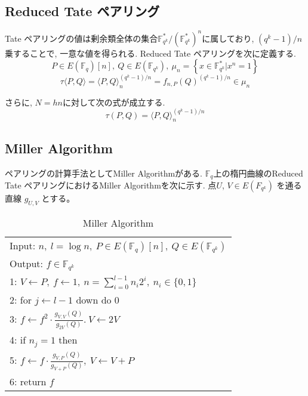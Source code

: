 \documentclass[twocolumn]{jsarticle} %
\begin{document}
\subsection{Reduced Tate ペアリング}
Tate ペアリングの値は剰余類全体の集合$\mathbb{F}_{q^k}^\ast/(\mathbb{F}_{q^k}^\ast)^n$に属しており, $(q^k - 1) / n$乗することで, 一意な値を得られる. Reduced Tate ペアリングを次に定義する.
\vspace{-2mm}
\[P \in E(\mathbb{F}_q)[n],\ Q \in E(\mathbb{F}_{q^k}),\ \mu_n = \left\{ x \in \mathbb{F}_{q^k}^\ast | x^n = 1 \right\}\]
\vspace{-4mm}
\[\tau \langle P,Q \rangle = \langle P,Q \rangle _n^{(q^k - 1) / n} = f_{n,P}(Q)^{(q^k - 1) / n} \in \mu_n\]
\par
\vspace{-2mm}
さらに, $N = hn$に対して次の式が成立する.
\vspace{-2mm}
\[
\tau(P,Q) = \langle P,Q \rangle _n^{(q^k - 1) / n}
\]
\vspace{-5mm}
\subsection{Miller Algorithm}
ペアリングの計算手法としてMiller Algorithmがある. $\mathbb{F}_q$上の楕円曲線のReduced Tate ペアリングにおけるMiller Algorithmを次に示す. 点$U$, $V ∈ E(F_{q^k})$ を通る直線 $g_{U,V}$ とする。\\
\begin{table}
 \begin{center}
  \begin{tabular}{|l|}
     \hline
    Input: $n, \ l=\log n, \ P \in E(\mathbb{F}_q)[n], \ Q \in E(\mathbb{F}_{q^k})$ \\
    Output: $f \in \mathbb{F}_{q^k}$  \\
     \hline
    1: \quad $V \gets P, \ f \gets 1,\ n=\sum^{l-1}_{i=0} n_i 2^i, \ n_i \in \{0,1\}$\\
    2: \quad for $j \gets l-1$ down do 0\\
    3: \quad \quad $f \gets f^2 \cdot \frac{g_{V,V}(Q)}{g_{2V}(Q)}.\ V \gets 2V$\\
    4: \quad if $n_j = 1$ then\\
    5: \quad \quad $f \gets f \cdot \frac{g_{V,P}(Q)}{g_{V+P}(Q)},\ V \gets V+P$\\
    6: \quad return $f$\\
     \hline
   \end{tabular}
 \end{center}
 \caption{Miller Algorithm}
\end{table}
\end{document}
